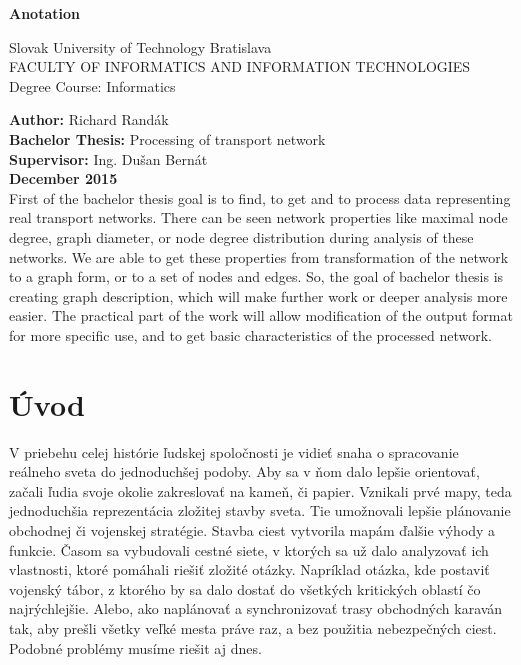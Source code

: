 \documentclass[12pt,twoside,slovak,a4paper]{article}
\begin{document}
\begin{titlepage}
\setlength{\parindent}{0pt}
\Large
\textbf{Anotation}
\normalsize
\newline
\newline
\begin{center}
Slovak University of Technology Bratislava\\
FACULTY OF INFORMATICS AND INFORMATION TECHNOLOGIES\\
Degree Course: Informatics\\
\end{center}

\textbf{Author:} Richard Randák\\
\textbf{Bachelor Thesis:} Processing of transport network\\
\textbf{Supervisor:} Ing. Dušan Bernát\\
\textbf{ December 2015 }\\
\newline
\newline
First of the bachelor thesis goal is to find, to get and to process data representing real transport networks. There can be seen network properties like maximal node degree, graph diameter, or node degree distribution during analysis of these networks. We are able to get these properties from transformation of the network to a graph form, or to a set of nodes and edges. So, the goal of bachelor thesis is creating graph description, which will make further work or deeper analysis more easier. The practical part of the work will allow modification of the output format for more specific use, and to get basic characteristics of the processed network.
\end{titlepage}

\tableofcontents
\newpage
\setcounter{page}{1}
\pagestyle{plain}
\newcommand{\sectionbreak}{\clearpage}

\section{Úvod}
V priebehu celej histórie ľudskej spoločnosti je vidieť snaha o spracovanie reálneho sveta do jednoduchšej podoby. Aby sa v ňom dalo lepšie orientovať, začali ľudia svoje okolie zakreslovať na kameň, či papier. Vznikali prvé mapy, teda jednoduchšia reprezentácia zložitej stavby sveta. Tie umožnovali lepšie plánovanie obchodnej či vojenskej stratégie. Stavba ciest vytvorila mapám ďalšie výhody a funkcie. Časom sa vybudovali cestné siete, v ktorých sa už dalo analyzovať ich vlastnosti, ktoré pomáhali riešiť zložité otázky. Napríklad otázka, kde postaviť vojenský tábor, z ktorého by sa dalo dostať do všetkých kritických oblastí čo najrýchlejšie. Alebo, ako naplánovať a synchronizovať trasy obchodných karaván tak, aby prešli všetky veľké mesta práve raz, a bez použitia nebezpečných ciest. Podobné problémy musíme riešit aj dnes.
	
\end{document}
